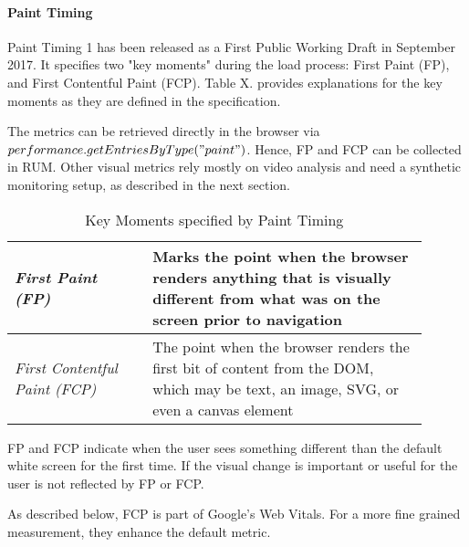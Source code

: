 

\paragraph{Paint Timing}

Paint Timing 1 has been released as a First Public Working Draft in September 2017.  
It specifies two "key moments" during the load process: First Paint (FP), and First Contentful Paint (FCP).
Table X. provides explanations for the key moments as they are defined in the specification. %

The metrics can be retrieved directly in the browser via $performance.getEntriesByType("paint")$.
Hence, FP and FCP can be collected in RUM.
Other visual metrics rely mostly on video analysis and need a synthetic monitoring setup, as described in the next section.

\begin{table}[h]
	\small
	\centering
	\begin{tabular}{ | p{0.3\linewidth} | p{0.6\linewidth} | }
	\hline
	\textit{First Paint (FP)} & Marks the point when the browser renders anything that is visually different from what was on the screen prior to navigation \\ 
	\hline
	\textit{First Contentful Paint (FCP)} & The point when the browser renders the first bit of content from the DOM, which may be text, an image, SVG, or even a canvas element \\  
	\hline
	\end{tabular}
	\medskip
	\caption{Key Moments specified by Paint Timing}
	\label{table:paint_timing}
\end{table}


FP and FCP indicate when the user sees something different than the default white screen for the first time.
If the visual change is important or useful for the user is not reflected by FP or FCP. %

As described below, FCP is part of Google's Web Vitals.
For a more fine grained measurement, they enhance the default metric.








